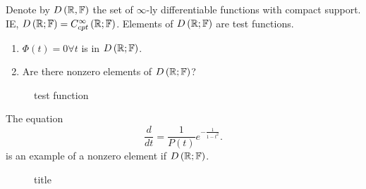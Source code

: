 \begin{definition}
	Denote by $D\left( \mathbb{R}, \mathbb{F} \right) $ the set of $\infty$-ly differentiable functions with compact support. IE, $D\left( \mathbb{R}; \mathbb{F} \right) = C^{\infty}_{cpt}\left( \mathbb{R}; \mathbb{F} \right) $. Elements of $D\left( \mathbb{R}; \mathbb{F} \right) $ are test functions. 
\end{definition}

\begin{example}
	\begin{enumerate}
		\item $\Phi\left( t \right) = 0 \forall  t $ is in $D\left( \mathbb{R};\mathbb{F} \right) $.
		\item Are there nonzero elements of $D\left( \mathbb{R}; \mathbb{F} \right) $?
			
	\end{enumerate}
\begin{figure}[ht]
    \centering
    \caption{test function}
    \label{fig:test-function}
\end{figure}

The equation
\[
	\frac{d}{dt} = \frac{1}{P\left( t \right) } e ^{-\frac{1}{1 - t^2}}
.\] 	
is an example of a nonzero element if $D\left( \mathbb{R};\mathbb{F} \right) $. 
\end{example}


\begin{figure}[ht]
    \centering
    \caption{title}
    \label{fig:title}
\end{figure}
